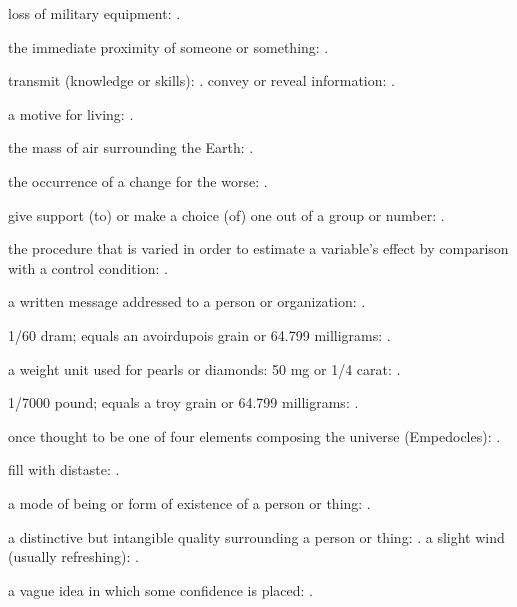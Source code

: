   loss of military equipment: .

  the immediate proximity of someone or something:   .

  transmit (knowledge or skills):   . convey or reveal information: .

  a motive for living: .

  the mass of air surrounding the Earth:   .

  the occurrence of a change for the worse: .

  give support (to) or make a choice (of) one out of a group or number:   .

  the procedure that is varied in order to estimate a variable's effect by comparison with a control condition:   .

  a written message addressed to a person or organization:   .

  1/60 dram; equals an avoirdupois grain or 64.799 milligrams: .

  a weight unit used for pearls or diamonds: 50 mg or 1/4 carat:   .

  1/7000 pound; equals a troy grain or 64.799 milligrams: .

  once thought to be one of four elements composing the universe (Empedocles): .

  fill with distaste:   .

  a mode of being or form of existence of a person or thing: .

  a distinctive but intangible quality surrounding a person or thing:   . a slight wind (usually refreshing):   .

  a vague idea in which some confidence is placed:   .

